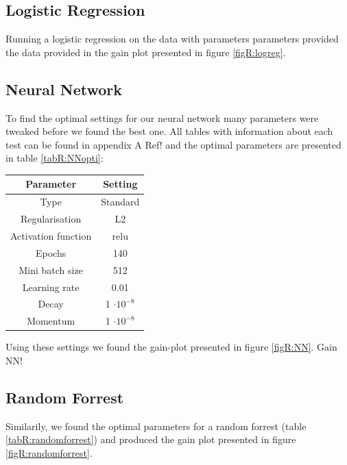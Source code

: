 \documentclass[12pt]{article}
\numberwithin{figure}{section}
\newcommand{\husk}[1]{\color{red} #1 \color{black}}
\begin{document}
\subsection{Logistic Regression}
Running a logistic regression on the data with parameters \husk{parameters} provided the data provided in the gain plot presented in figure \ref{figR:logreg}. \\
\subsection{Neural Network}
To find the optimal settings for our neural network many parameters were tweaked before we found the best one. All tables with information about each test can be found in appendix A \husk{Ref!} and the optimal parameters are presented in table \ref{tabR:NNopti}:
\begin{table}[H]
\centering
\begin{tabular}{c|c}
Parameter & Setting \\ \hline
Type & Standard \\ \hline
Regularisation & L2 \\ \hline
Activation function & relu \\ \hline
Epochs & 140 \\ \hline
Mini batch size & 512 \\ \hline
Learning rate & 0.01 \\ \hline
Decay & 1 $\cdot 10^{-8}$ \\ \hline
Momentum & 1 $\cdot 10^{-8}$
\end{tabular}
\end{table}
Using these settings we found the gain-plot presented in figure \ref{figR:NN}. \husk{Gain NN!}
\subsection{Random Forrest}
Similarily, we found the optimal parameters for a random forrest (table \ref{tabR:randomforrest}) and produced the gain plot presented in figure \ref{figR:randomforrest}.
\end{document}
